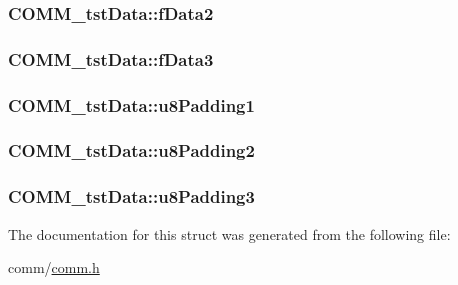 \subsubsection[{f\+Data2}]{ C\+O\+M\+M\+\_\+tst\+Data\+::f\+Data2}\label{struct_c_o_m_m__tst_data_a85703d043dde84ed9c1658b8e1fc22a6}
\hypertarget{struct_c_o_m_m__tst_data_af3b392255898725279408b3c7110e7c6}{}
\subsubsection[{f\+Data3}]{ C\+O\+M\+M\+\_\+tst\+Data\+::f\+Data3}\label{struct_c_o_m_m__tst_data_af3b392255898725279408b3c7110e7c6}
\hypertarget{struct_c_o_m_m__tst_data_a0cfd5176ee0466114b29d8d527efbdfd}{}
\subsubsection[{u8\+Padding1}]{ C\+O\+M\+M\+\_\+tst\+Data\+::u8\+Padding1}\label{struct_c_o_m_m__tst_data_a0cfd5176ee0466114b29d8d527efbdfd}
\hypertarget{struct_c_o_m_m__tst_data_a5d954d18f6c549db9cae4bbf191ac847}{}
\subsubsection[{u8\+Padding2}]{ C\+O\+M\+M\+\_\+tst\+Data\+::u8\+Padding2}\label{struct_c_o_m_m__tst_data_a5d954d18f6c549db9cae4bbf191ac847}
\hypertarget{struct_c_o_m_m__tst_data_ae3055e660f7570e043dcad858aa05239}{}
\subsubsection[{u8\+Padding3}]{ C\+O\+M\+M\+\_\+tst\+Data\+::u8\+Padding3}\label{struct_c_o_m_m__tst_data_ae3055e660f7570e043dcad858aa05239}


The documentation for this struct was generated from the following file\+:\begin{DoxyCompactItemize}
\item 
comm/\hyperlink{comm_8h}{comm.\+h}\end{DoxyCompactItemize}

